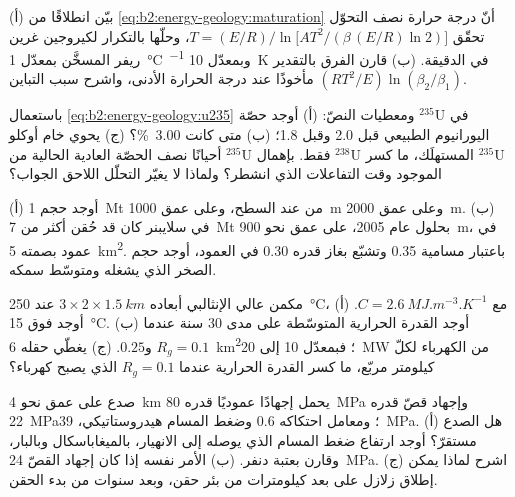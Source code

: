 \begin{exercise}[$\star\star$]\label{exo:b2:energy-geology:6}
(أ) بيّن انطلاقًا من \eqref{eq:b2:energy-geology:maturation} أنّ درجة حرارة نصف التحوّل تحقّق
$T = (E/R)\big/\ln\bigl[A T^2/(\beta\,(E/R)\ln 2)\bigr]$، وحلّها بالتكرار لكيروجين غرين
ريفر المسخَّن بمعدّل \qty{1}{\celsius\per\Myr} وبمعدّل \qty{10}{K} في الدقيقة. (ب) قارن
الفرق بالتقدير $(RT^2/E)\ln(\beta_2/\beta_1)$ مأخوذًا عند درجة الحرارة الأدنى، واشرح
سبب التباين.
\end{exercise}

\begin{exercise}[$\star\star$]\label{exo:b2:energy-geology:7}
باستعمال \eqref{eq:b2:energy-geology:u235} ومعطيات النصّ: (أ) أوجد حصّة $^{235}$U في
اليورانيوم الطبيعي قبل \qty{2.0}{\Ga} وقبل \qty{1.8}{\Ga}؛ (ب) متى كانت \qty{3.00}{\percent}؟
(ج) يحوي خام أوكلو أحيانًا نصف الحصّة العادية الحالية من $^{235}$U فقط. بإهمال $^{238}$U
المستهلَك، ما كسر $^{235}$U الموجود وقت التفاعلات الذي انشطر؟ ولماذا
لا يغيّر التحلّل اللاحق الجواب؟
\end{exercise}

\begin{exercise}[$\star\star$]\label{exo:b2:energy-geology:8}
(أ) أوجد حجم \qty{1}{Mt} من  عند السطح، وعلى عمق \qty{1000}{m} وعلى عمق
\qty{2000}{m}. (ب) في سلايبنر كان قد حُقن أكثر من \qty{7}{Mt} بحلول عام 2005، على عمق نحو
\qty{900}{m}، في عمود بصمته \qty{5}{km^2}. باعتبار مسامية 0.35 وتشبّع بغاز 
قدره 0.30 في العمود، أوجد حجم الصخر الذي يشغله ومتوسّط سمكه.
\end{exercise}

\begin{exercise}[$\star\star$]\label{exo:b2:energy-geology:9}
مكمن عالي الإنثالبي أبعاده $3 \times 2 \times \qty{1.5}{km}$ عند \qty{250}{\celsius}، مع
$C = \qty{2.6}{MJ.m^{-3}.K^{-1}}$. (أ) أوجد  فوق \qty{15}{\celsius}. (ب) أوجد
القدرة الحرارية المتوسّطة على مدى 30 سنة عندما $R_g = 0.1$ و$0.25$. (ج) يغطّي حقله \qty{6}{km^2}؛
فبمعدّل 10 إلى \qty{20}{MW} من الكهرباء لكلّ كيلومتر مربّع، ما كسر القدرة الحرارية عندما
$R_g = 0.1$ الذي يصبح كهرباء؟
\end{exercise}

\begin{exercise}[$\star\star\star$]\label{exo:b2:energy-geology:10}
صدع على عمق نحو \qty{4}{km} يحمل إجهادًا عموديًا قدره \qty{80}{MPa} وإجهاد قصّ قدره
\qty{22}{MPa}؛ ومعامل احتكاكه 0.6 وضغط المسام هيدروستاتيكي،
\qty{39}{MPa}. (أ) هل الصدع مستقرّ؟ أوجد ارتفاع ضغط المسام الذي يوصله إلى الانهيار، بالميغاباسكال
وبالبار، وقارن بعتبة دنفر. (ب) الأمر نفسه إذا كان إجهاد القصّ
\qty{24}{MPa}. (ج) اشرح لماذا يمكن إطلاق زلازل على بعد كيلومترات من بئر حقن،
وبعد سنوات من بدء الحقن.
\end{exercise}

